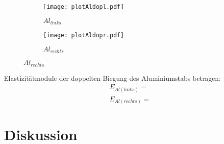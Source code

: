 \begin{figure}[H]
\caption{Graph für Doppelbiegung, $Al_{links}$ und $Al_{rechts}$}
\label{fig:4}
\begin{subfigure}{0.495\linewidth}
    \centering
    \texttt{[image: plotAldopl.pdf]}
    \caption{$Al_{links}$}
    \label{fig:4a}
\end{subfigure}
\begin{subfigure}{0.495\linewidth}
    \centering
    \texttt{[image: plotAldopr.pdf]}
    \caption{$Al_{rechts}$}
    \label{fig:4b}
\end{subfigure}
\end{figure}

\justifying Elastizitätmodule der doppelten Biegung des Aluminiumstabs betragen:
\begin{align}
    &E_{Al(links)} = \text{} \label{eq:}\\
    &E_{Al(rechts)} = \text{} \label{eq:}
\end{align}


\section{Diskussion}\justifying

\newpage

\printbibliography
